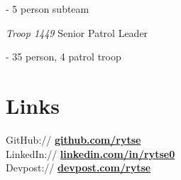 \documentclass[]{deedy-resume-openfont}
\begin{document}
\begin{minipage}[t]{0.33\textwidth}
\indent - 5 person subteam

\vspace{0.125cm}

\textit{Troop 1449} Senior Patrol Leader

\indent - 35 person, 4 patrol troop

\sectionsep
\section{Links} 

\vspace{0.125cm}

GitHub:// \href{https://github.com/rytse}{\bf github.com/rytse} \\
LinkedIn://  \href{https://www.linkedin.com/in/rytse0}{\bf linkedin.com/in/rytse0} \\
Devpost:// \href{https://devpost.com/rytse}{\bf devpost.com/rytse} \\

\end{minipage} 
\hfill
\end{document}

